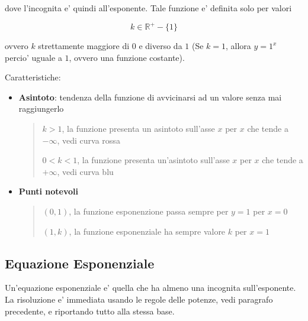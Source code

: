 \documentclass{article}
\begin{document}
{{    dove l'incognita e' quindi all'esponente. Tale funzione e' definita solo per valori 
    
    $$ k \in \mathbb{R}^+ - \{1\} $$

    ovvero $ k $ strettamente maggiore di $ 0 $ e diverso da $ 1 $ \small{(Se $ k = 1 $, allora $ y = 1^x $ percio' uguale a $ 1 $, ovvero una funzione costante)}.

  }

  Caratteristiche:
  \begin{itemize}
    \item \textbf{Asintoto}: tendenza della funzione di avvicinarsi ad un valore senza mai raggiungerlo
    \begin{quote}
      $ k > 1 $, la funzione presenta un asintoto sull'asse $ x $ per $ x $ che tende a $ -\infty $, vedi curva rossa

      $ 0 < k < 1 $, la funzione presenta un'asintoto sull'asse $ x $ per $ x $ che tende a $ +\infty $, vedi curva blu
    \end{quote}
    \item \textbf{Punti notevoli}
    \begin{quote}
      $ (0,1) $, la funzione esponenzione passa sempre per $ y = 1 $ per $ x = 0 $

      $ (1,k) $, la funzione esponenziale ha sempre valore $ k $ per $ x = 1 $
    \end{quote}
  \end{itemize}

  \pagebreak

  \subsection{Equazione Esponenziale}
  Un'equazione esponenziale e' quella che ha almeno una incognita sull'esponente. La risoluzione e' immediata usando le regole delle potenze, vedi paragrafo precedente, e riportando tutto alla stessa base.

}
\end{document}
